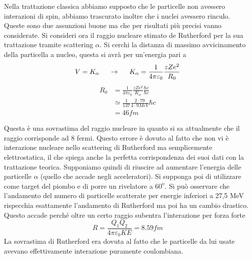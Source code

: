 Nella trattazione classica abbiamo supposto che le particelle non avessero interazioni di spin, abbiamo trascurato inoltre che i nuclei avessero rinculo. 
Queste sono due assunzioni buone ma che per risultati più precisi vanno considerate.
Si consideri ora il raggio nucleare stimato de Rutherford per la sua trattazione tramite scattering $\alpha$. 
Si cerchi la distanza di massimo avvicinamento della particella a nucleo, questa si avrà per un'energia pari a 
\begin{equation}
V=K_\alpha \hspace{0.5cm}\to \hspace{0.5cm}K_{\alpha}=\frac{1}{4\pi\varepsilon_0}\frac{zZe^2}{R_0}
\end{equation}
\begin{equation}
\begin{split}
R_0 &=\frac{1}{4\pi\varepsilon_0}\frac{zZe^2}{K_{\alpha}}\frac{\hbar c}{\hbar c}\\
&\simeq\frac{1}{137}\frac{2\cdot 79}{4\cdot 9 MeV}\hbar c\\
&=46 fm
\end{split}
\end{equation}

Questa è una sovrastima del raggio nucleare in quanto si sa attualmente che il raggio corrisponde ad 8 fermi. 
Questo errore è dovuto al fatto che non vi è interazione nucleare nello scattering di Rutherford ma semplicemente elettrostatica, il che spiega anche la perfetta corrispondenza dei suoi dati con la trattazione teorica. 
Supponiamo quindi di riuscire ad aumentare l'energia delle particelle $\alpha$ (quello che accade negli acceleratori). 
Si supponga poi di utilizzare come target del piombo e di porre un rivelatore a $60^o$. 
Si può osservare che l'andamento del numero di particelle scatterate per energie inferiori a 27,5 MeV rispecchia esattamente l'andamento di Rutherford ma poi ha un cambio drastico. 
Questo accade perché oltre un certo raggio subentra l'interazione per forza forte
\begin{equation}
R=\frac{Q_1Q_2}{4\pi\varepsilon_0KE}=8.59 fm
\end{equation}
La sovrastima di Rutherford era dovuta al fatto che le particelle da lui usate avevano effettivamente interazione puramente coulombiana.


